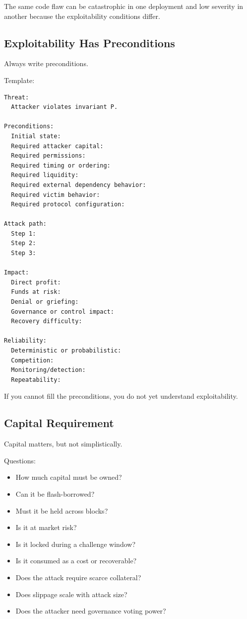 The same code flaw can be catastrophic in one deployment and low
severity in another because the exploitability conditions differ.

\subsection{Exploitability Has Preconditions}

Always write preconditions.

Template:

\begin{lstlisting}
Threat:
  Attacker violates invariant P.

Preconditions:
  Initial state:
  Required attacker capital:
  Required permissions:
  Required timing or ordering:
  Required liquidity:
  Required external dependency behavior:
  Required victim behavior:
  Required protocol configuration:

Attack path:
  Step 1:
  Step 2:
  Step 3:

Impact:
  Direct profit:
  Funds at risk:
  Denial or griefing:
  Governance or control impact:
  Recovery difficulty:

Reliability:
  Deterministic or probabilistic:
  Competition:
  Monitoring/detection:
  Repeatability:
\end{lstlisting}

If you cannot fill the preconditions, you do not yet understand
exploitability.

\subsection{Capital Requirement}

Capital matters, but not simplistically.

Questions:

\begin{itemize}
\tightlist
\item
  How much capital must be owned?
\item
  Can it be flash-borrowed?
\item
  Must it be held across blocks?
\item
  Is it at market risk?
\item
  Is it locked during a challenge window?
\item
  Is it consumed as a cost or recoverable?
\item
  Does the attack require scarce collateral?
\item
  Does slippage scale with attack size?
\item
  Does the attacker need governance voting power?
\end{itemize}

